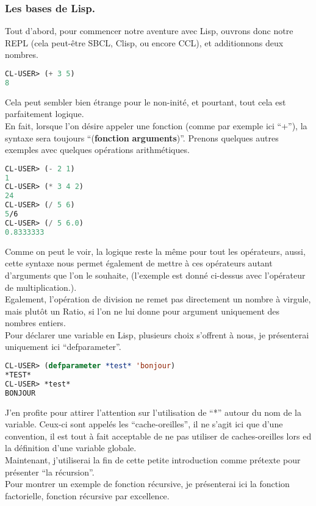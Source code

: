 \documentclass[a4paper, 12pt]{article}
\numberwithin{equation}{subsection}
\begin{document}
\subsubsection{Les bases de Lisp.}
Tout d'abord, pour commencer notre aventure avec Lisp, ouvrons donc notre REPL (cela peut-être SBCL, Clisp, ou encore CCL), et additionnons deux nombres. \\
\begin{lstlisting}[language=Lisp]
CL-USER> (+ 3 5)
8
\end{lstlisting}
Cela peut sembler bien étrange pour le non-inité, et pourtant, tout cela est parfaitement logique. \\
En fait, lorsque l'on désire appeler une fonction (comme par exemple ici ``+''), la syntaxe sera toujours ``({\bf fonction} {\bf arguments})''. Prenons quelques autres exemples avec quelques opérations arithmétiques. \\
\begin{lstlisting}[language=Lisp]
CL-USER> (- 2 1)
1
CL-USER> (* 3 4 2)
24
CL-USER> (/ 5 6)
5/6
CL-USER> (/ 5 6.0)
0.8333333
\end{lstlisting}
Comme on peut le voir, la logique reste la même pour tout les opérateurs, aussi, cette syntaxe nous permet également de mettre à ces opérateurs autant d'arguments que l'on le souhaite, (l'exemple est donné ci-dessus avec l'opérateur de multiplication.). \\
Egalement, l'opération de division ne remet pas directement un nombre à virgule, mais plutôt un Ratio, si l'on ne lui donne pour argument uniquement des nombres entiers. \\
Pour déclarer une variable en Lisp, plusieurs choix s'offrent à nous, je présenterai uniquement ici ``defparameter''.
\begin{lstlisting}[language=Lisp]
CL-USER> (defparameter *test* 'bonjour)
*TEST*
CL-USER> *test*
BONJOUR
\end{lstlisting}
J'en profite pour attirer l'attention sur l'utilisation de ``*'' autour du nom de la variable. Ceux-ci sont appelés les ``cache-oreilles'', il ne s'agit ici que d'une convention, il est tout à fait acceptable de ne pas utiliser de caches-oreilles lors ed la définition d'une variable globale. \\[0.2cm]
Maintenant, j'utiliserai la fin de cette petite introduction comme prétexte pour présenter ``la récursion''. \\
Pour montrer un exemple de fonction récursive, je présenterai ici la fonction factorielle, fonction récursive par excellence. \\
\end{document}
